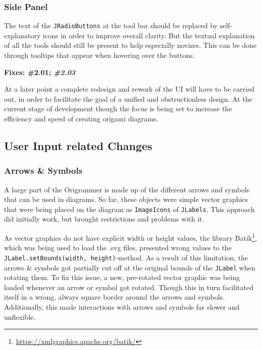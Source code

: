 \subsubsection{Side Panel}

The text of the \texttt{JRadioButtons} at the tool bar should be replaced by self-explanatory icons in order to improve overall clarity. But the textual explanation of all the tools should still be present to help especially novizes. This can be done through tooltips that appear when hovering over the buttons.

\noindent \textbf{Fixes: \#2.01; \emph{\#2.03}}
\newline

\noindent At a later point a complete redesign and rework of the UI will have to be carried out, in order to facilitate the goal of a unified and obstructionless design. At the current stage of development though the focus is being set to increase the efficiency and speed of creating origami diagrams.

\subsection{User Input related Changes}

\subsubsection{Arrows \& Symbols}
A large part of the Origrammer is made up of the different arrows and symbols that can be used in diagrams. So far, these objects were simple vector graphics that were being placed on the diagram as \texttt{ImageIcons} of \texttt{JLabels}. This approach did initially work, but brought restrictions and problems with it.

As vector graphics do not have explicit width or height values, the library Batik\footnote{\url{https://xmlgraphics.apache.org/batik/}}, which was being used to load the .svg files, presented wrong values to the \texttt{JLabel.setBounds(width, height)}-method. As a result of this limitation, the arrows \& symbols got partially cut off at the original bounds of the \texttt{JLabel} when rotating them. To fix this issue, a new, pre-rotated vector graphic was being loaded whenever an arrow or symbol got rotated. Though this in turn facilitated itself in a wrong, always square border around the arrows and symbols. Additionally, this made interactions with arrows and symbols far slower and unflexible.

